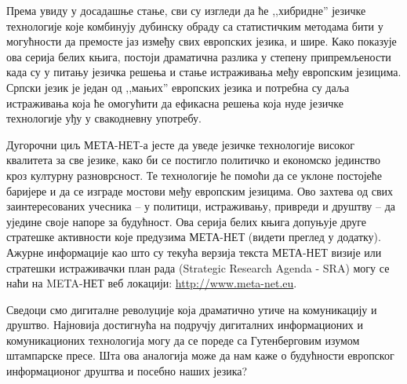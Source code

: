 {\begin{multicols}{2}

Према увиду у досадашње стање, сви су изгледи да ће ,,хибридне'' језичке технологије које комбинују дубинску обраду са статистичким методама бити у могућности да премосте јаз између свих европских језика, и шире. Како показује ова серија белих књига, постоји драматична разлика у степену припремљености када су у питању језичка решења и стање истраживања међу европским језицима.  Српски језик је један од ,,мањих'' европских језика и потребна су даља истраживања која ће омогућити да ефикасна решења која нуде језичке технологије уђу у свакодневну употребу.

Дугорочни циљ МЕТА-НЕТ-а јесте да уведе језичке технологије високог квалитета за све језике, како би се постигло политичко и економско јединство кроз културну разноврсност. Те технологије ће помоћи да се уклоне постојеће баријере и да се изграде мостови међу европским језицима. Ово захтева од свих заинтересованих учесника – у политици, истраживању, привреди и друштву – да уједине своје напоре за будућност. Ова серија белих књига допуњује друге стратешке активности које предузима МЕТА-НЕТ (видети преглед у додатку). Ажурне информације као што су текућа верзија текста МЕТА-НЕТ визије  \cite{Meta1} или стратешки истраживачки план рада (Strategic Research Agenda - SRA) могу се наћи на META-НЕТ веб локацији: \url{http://www.meta-net.eu}.   
    
\end{multicols}

\clearpage


  
\begin{multicols}{2}


Сведоци смо дигиталне револуције која драматично утиче на комуникацију и друштво. Најновија достигнућа на подручју дигиталних информационих и комуникационих технологија могу да се пореде са Гутенберговим изумом штампарске пресе. Шта ова аналогија може да нам каже о будућности европског информационог друштва и посебно наших језика?





\end{multicols}}

